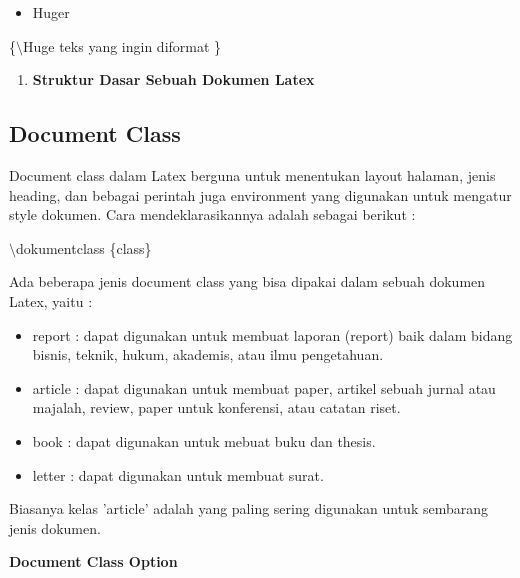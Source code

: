 \begin{itemize}
\item Huger
\end{itemize}
\hspace{0,5in}\{$\setminus$Huge teks yang ingin diformat \}

\begin{enumerate}
\setcounter{enumi}{\thenumberedCntB}
\item \textbf{Struktur Dasar Sebuah Dokumen Latex}
\setcounter{numberedCntB}{\theenumi}
\end{enumerate}
\subsection {Document Class}\par \vspace{12pt}

Document class dalam Latex berguna untuk menentukan layout halaman, jenis heading, dan bebagai perintah juga environment yang digunakan untuk mengatur style dokumen. Cara mendeklarasikannya adalah sebagai berikut :\par \vspace{12pt}

$\setminus$dokumentclass \{class\}\par \vspace{12pt}

Ada beberapa jenis document class yang bisa dipakai dalam sebuah dokumen Latex, yaitu :

\begin{itemize}
\item report : dapat digunakan untuk membuat laporan (report) baik dalam bidang bisnis, teknik, hukum, akademis, atau ilmu pengetahuan.
\item article : dapat digunakan untuk membuat paper, artikel sebuah jurnal atau majalah, review, paper untuk konferensi, atau catatan riset.
\item book : dapat digunakan untuk mebuat buku dan thesis.
\item letter : dapat digunakan untuk membuat surat.
\end{itemize}
\hspace{0,5in}Biasanya kelas 'article' adalah yang paling sering digunakan untuk sembarang jenis dokumen.\par \vspace{12pt}



\textbf{Document Class Option}\par \vspace{12pt}

